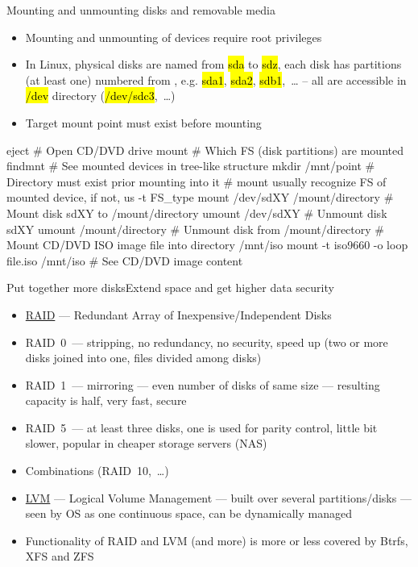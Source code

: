 \documentclass[compress, ucs, xelatex, 11pt, xcolor=svgnames,
  hyperref={
    bookmarks=true,
    unicode=true,
    colorlinks=true,
    pdftitle={Linux, command line and MetaCentrum},
    plainpages=false,
    pdfauthor={Vojtech Zeisek},
    pdfsubject={Course about use of Linux command line, writing shell scripts and using MetaCentrum of CESNET},
    pdfcreator={XeLaTeX},
    pdfkeywords={Linux, GNU, BASH, shell, command line, MetaCentrum},
    linkcolor=DarkRed,
    anchorcolor=DarkBlue,
    citecolor=Indigo,
    filecolor=NavyBlue,
    menucolor=DarkMagenta,
    urlcolor=DarkBlue,
    pdftex},
  url={hyphens, lowtilde} %
  ]{beamer}
\renewcommand{\texttt}[1]{\hl{\ttfamily #1}}
\begin{document}
\begin{frame}[fragile]{Mounting and unmounting disks and removable media}
  \begin{itemize}
    \item Mounting and unmounting of devices require root privileges
    \item In Linux, physical disks are named from \texttt{sda} to \texttt{sdz}, each disk has partitions (at least one) numbered from \texttt{1}, e.g. \texttt{sda1}, \texttt{sda2}, \texttt{sdb1},~\ldots{ }-- all are accessible in \texttt{/dev} directory (\texttt{/dev/sdc3},~\ldots)
    \item Target mount point must exist before mounting
  \end{itemize}
  \begin{bashcode}
    eject # Open CD/DVD drive
    mount # Which FS (disk partitions) are mounted
    findmnt # See mounted devices in tree-like structure
    mkdir /mnt/point # Directory must exist prior mounting into it
    # mount usually recognize FS of mounted device, if not, us -t FS_type
    mount /dev/sdXY /mount/directory # Mount disk sdXY to /mount/directory
    umount /dev/sdXY # Unmount disk sdXY
    umount /mount/directory # Unmount disk from /mount/directory
    # Mount CD/DVD ISO image file into directory /mnt/iso
    mount -t iso9660 -o loop file.iso /mnt/iso # See CD/DVD image content
  \end{bashcode}
\end{frame}

\begin{frame}{Put together more disks}{Extend space and get higher data security}
  \label{LVMRAID}
  \begin{itemize}
    \item \href{https://en.wikipedia.org/wiki/RAID}{RAID} --- Redundant Array of Inexpensive/Independent Disks
    \item RAID~0~--- stripping, no redundancy, no security, speed up (two or more disks joined into one, files divided among disks)
    \item RAID~1~--- mirroring --- even number of disks of same size --- resulting capacity is half, very fast, secure
    \item RAID~5~--- at least three disks, one is used for parity control, little bit slower, popular in cheaper storage servers (NAS)
    \item Combinations (RAID~10,~\ldots)
    \item \href{https://en.wikipedia.org/wiki/Logical_volume_management}{LVM} --- Logical Volume Management --- built over several partitions/disks --- seen by OS as one continuous space, can be dynamically managed
    \item Functionality of RAID and LVM (and more) is more or less covered by Btrfs, XFS and ZFS
  \end{itemize}
\end{frame}
\end{document}
